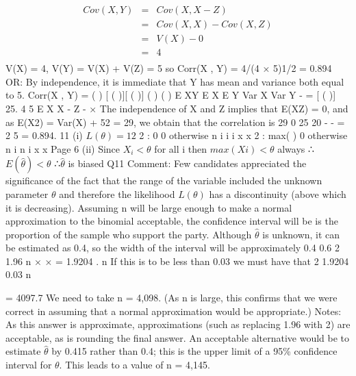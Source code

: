 \documentclass[a4paper,12pt]{article}
\begin{document}
\begin{eqnarray*}
Cov(X , Y) &=& Cov(X , X - Z) \\ &=& Cov(X , X) - Cov(X , Z) \\ &=& V(X) - 0 \\&=& 4\\
\end{eqnarray*}
V(X) = 4, V(Y) = V(X) + V(Z) = 5
so Corr(X , Y) = 4/(4 × 5)1/2 = 0.894
OR:
By independence, it is immediate that Y has mean and variance both equal
to 5.
Corr(X , Y) =
( ) [ ( )][ ( )]
( ) ( )
E XY E X E Y
Var X Var Y
- =
[ ( )] 25.
4 5
E X X - Z -
×
The independence of X and Z implies that E(XZ) = 0, and as
E(X2) = Var(X) + 52 = 29, we obtain that the correlation is
29 0 25
20
- - =
2
5
= 0.894.
11 (i) $L(\theta) = 1 2$
2
: 0
0 otherwise
n
i
i i
x
x
2
: max( )
0 otherwise
n
i
n i
x
x
Page 6
(ii) Since $X_i < \theta$ for all i
then $max(Xi) < \theta$ always
∴ $E( \hat{\theta}) < \theta$ ∴$\hat{\theta}$ is biased
Q11 Comment: Few candidates appreciated the significance of the fact that the range of the
variable included the unknown parameter $\theta$ and therefore the likelihood $L(\theta)$ has a
discontinuity (above which it is decreasing).
 Assuming n will be large enough to make a normal approximation to the
binomial acceptable, the confidence interval will be
is the proportion of the sample who support the party.
Although $\hat{\theta}$ is unknown, it can be estimated as 0.4, so the width of the interval
will be approximately
0.4 0.6
2 1.96
n
× × =
1.9204
.
n
If this is to be less than 0.03 we must have that
2 1.9204
0.03
n

= 4097.7
We need to take n = 4,098.
(As n is large, this confirms that we were correct in assuming that a normal
approximation would be appropriate.)
Notes: As this answer is approximate, approximations (such as replacing 1.96
with 2) are acceptable, as is rounding the final answer.
An acceptable alternative would be to estimate $\hat{\theta}$ by 0.415 rather than 0.4; this
is the upper limit of a 95\% confidence interval for $\theta$. This leads to a value of
n = 4,145.
\end{document}
